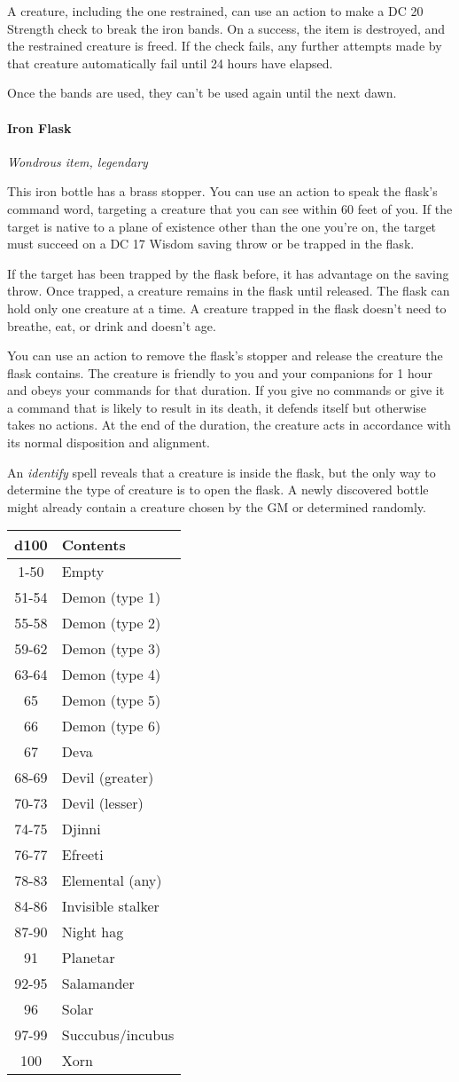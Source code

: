 \documentclass[
]{article}
\begin{document}
A creature, including the one restrained, can use an action to make a DC
20 Strength check to break the iron bands. On a success, the item is
destroyed, and the restrained creature is freed. If the check fails, any
further attempts made by that creature automatically fail until 24 hours
have elapsed.

Once the bands are used, they can't be used again until the next dawn.

\hypertarget{iron-flask}{%
\paragraph{Iron Flask}\label{iron-flask}}

\emph{Wondrous item, legendary}

This iron bottle has a brass stopper. You can use an action to speak the
flask's command word, targeting a creature that you can see within 60
feet of you. If the target is native to a plane of existence other than
the one you're on, the target must succeed on a DC 17 Wisdom saving
throw or be trapped in the flask.

If the target has been trapped by the flask before, it has advantage on
the saving throw. Once trapped, a creature remains in the flask until
released. The flask can hold only one creature at a time. A creature
trapped in the flask doesn't need to breathe, eat, or drink and doesn't
age.

You can use an action to remove the flask's stopper and release the
creature the flask contains. The creature is friendly to you and your
companions for 1 hour and obeys your commands for that duration. If you
give no commands or give it a command that is likely to result in its
death, it defends itself but otherwise takes no actions. At the end of
the duration, the creature acts in accordance with its normal
disposition and alignment.

An \emph{identify} spell reveals that a creature is inside the flask,
but the only way to determine the type of creature is to open the flask.
A newly discovered bottle might already contain a creature chosen by the
GM or determined randomly.

\begin{longtable}[]{@{}cl@{}}
\toprule
d100 & Contents\tabularnewline
\midrule
\endhead
1-50 & Empty\tabularnewline
51-54 & Demon (type 1)\tabularnewline
55-58 & Demon (type 2)\tabularnewline
59-62 & Demon (type 3)\tabularnewline
63-64 & Demon (type 4)\tabularnewline
65 & Demon (type 5)\tabularnewline
66 & Demon (type 6)\tabularnewline
67 & Deva\tabularnewline
68-69 & Devil (greater)\tabularnewline
70-73 & Devil (lesser)\tabularnewline
74-75 & Djinni\tabularnewline
76-77 & Efreeti\tabularnewline
78-83 & Elemental (any)\tabularnewline
84-86 & Invisible stalker\tabularnewline
87-90 & Night hag\tabularnewline
91 & Planetar\tabularnewline
92-95 & Salamander\tabularnewline
96 & Solar\tabularnewline
97-99 & Succubus/incubus\tabularnewline
100 & Xorn\tabularnewline
\bottomrule
\end{longtable}
\end{document}
